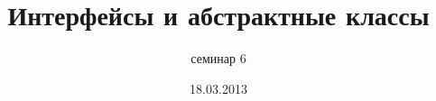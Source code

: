 \documentclass[hyperref={unicode,colorlinks=true,urlbordercolor=blue,linkcolor=blue,urlcolor=blue,pdfborderstyle={/S/U/W 1}}]{beamer}
\title{Интерфейсы и абстрактные классы}
\subtitle{семинар 6}
\date{18.03.2013}
\begin{document}
\frame{\titlepage}


\end{document}
